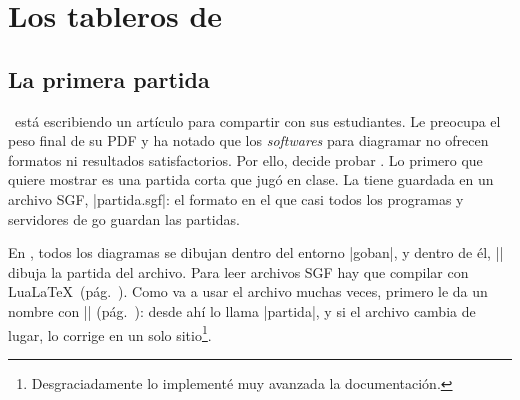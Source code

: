 \section{Los tableros de \karu}

\subsection{La primera partida}
\label{tut:primera}

\karu\ está escribiendo un artículo para compartir con sus estudiantes. Le preocupa el peso final de su PDF y ha notado que los \emph{softwares} para diagramar no ofrecen formatos ni resultados satisfactorios. Por ello, decide probar \pgfgoname. Lo primero que quiere mostrar es una partida corta que jugó en clase. La tiene guardada en un archivo SGF, |partida.sgf|: el formato en el que casi todos los programas y servidores de go guardan las partidas.
  
\begin{figure}[H]
	\centering
	\begin{goban}[captures, label = {at = {north, west}}]
	\end{goban}
\end{figure}

En \pgfgoname, todos los diagramas se dibujan dentro del entorno |goban|, y dentro de él, |\sgf| dibuja la partida del archivo. Para leer archivos SGF hay que compilar con Lua\LaTeX\ (pág.~\pageref{subsec:kernel}). Como va a usar el archivo muchas veces, primero le da un nombre con |\pgfgodefinesgf| (pág.~\pageref{subsec:sgfnombres}): desde ahí lo llama |partida|, y si el archivo cambia de lugar, lo corrige en un solo sitio\footnote{Desgraciadamente lo implement\'e muy avanzada la documentaci\'on.}.

\begin{codeexample}[width=4.8cm]

\begin{goban}
\end{goban}
\end{codeexample}


